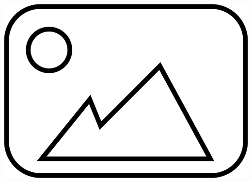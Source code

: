 \documentclass[aspectratio=169,10pt]{beamer}
\begin{document}
\begin{frame}
\begin{columns}[T]
\begin{column}{0.5\textwidth}
            \centering
            \includegraphics[width=\textwidth]{placeholder.png} %
            
        \end{column}
    \end{columns}
\end{frame}

    

            
\end{document}

